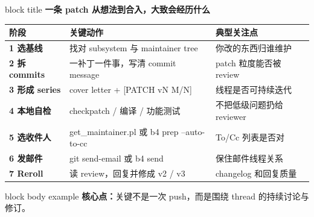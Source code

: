 \documentclass[aspectratio=169,professionalfonts]{beamer}
\newcommand{\sectiontitle}[1]{
  \begin{beamercolorbox}[wd=\linewidth,sep=0.7em,rounded=true]{block title}
    \usebeamerfont*{frametitle}\Large\bfseries #1
  \end{beamercolorbox}
  \vspace{0.4em}
}
\begin{document}
\begin{frame}
  \sectiontitle{一条 patch 从想法到合入，大致会经历什么}
  \small
  \begin{tabularx}{\textwidth}{>{\bfseries}p{} >{\raggedright\arraybackslash}X >{\raggedright\arraybackslash}X}
    \toprule
    阶段 & 关键动作 & 典型关注点 \\
    \midrule
    1 选基线 & 找对 subsystem 与 maintainer tree & 你改的东西归谁维护 \\
    2 拆 commits & 一补丁一件事，写清 commit message & patch 粒度能否被 review \\
    3 形成 series & cover letter + [PATCH vN M/N] & 线程是否可持续迭代 \\
    4 本地自检 & checkpatch / 编译 / 功能测试 & 不把低级问题扔给 reviewer \\
    5 选收件人 & get\_maintainer.pl 或 b4 prep --auto-to-cc & To/Cc 列表是否对 \\
    6 发邮件 & git send-email 或 b4 send & 保住邮件线程关系 \\
    7 Reroll & 读 review，回复并修成 v2 / v3 & changelog 和回复质量 \\
    \bottomrule
  \end{tabularx}
  \vspace{0.6em}
  \begin{beamercolorbox}[wd=\linewidth,sep=0.7em,rounded=true]{block body example}
    \textbf{核心点：}关键不是一次 push，而是围绕 thread 的持续讨论与修订。
  \end{beamercolorbox}
\end{frame}
\end{document}
